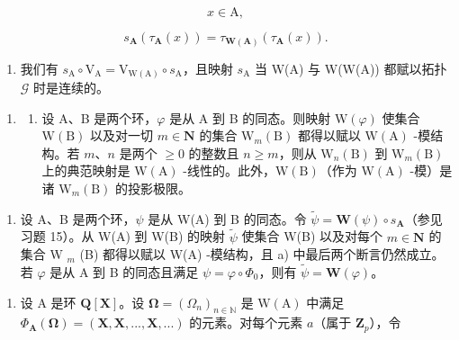 \[
x \in \mathrm{A},
\]

\[
s _ {\mathbf {A}} \left(\tau_ {\mathbf {A}} (x)\right) = \tau_ {\mathbf {W} (\mathbf {A})} \left(\tau_ {\mathbf {A}} (x)\right).
\]

\begin{enumerate}
\def\labelenumi{\alph{enumi})}
\setcounter{enumi}{5}
\tightlist
\item
  我们有 \(s_{\mathrm{A}} \circ \mathrm{V}_{\mathrm{A}} = \mathrm{V}_{\mathrm{W(A)}} \circ s_{\mathrm{A}}\)，且映射 \(s_{\mathrm{A}}\) 当 W(A) 与 W(W(A)) 都赋以拓扑 \(\mathcal{G}\) 时是连续的。
\end{enumerate}

\begin{enumerate}
\def\labelenumi{\arabic{enumi})}
\setcounter{enumi}{15}
\tightlist
\item
  \begin{enumerate}
  \def\labelenumii{\alph{enumii})}
  \tightlist
  \item
    设 A、B 是两个环，\(\varphi\) 是从 A 到 B 的同态。则映射 \(\mathrm{W}(\varphi)\) 使集合 \(\mathrm{W(B)}\) 以及对一切 \(m \in \mathbf{N}\) 的集合 \(\mathrm{W}_{m}(\mathrm{B})\) 都得以赋以 \(\mathrm{W(A)}\) -模结构。若 \(m\)、\(n\) 是两个 \(\geqslant 0\) 的整数且 \(n \geqslant m\)，则从 \(\mathrm{W}_{n}(\mathrm{B})\) 到 \(\mathrm{W}_{m}(\mathrm{B})\) 上的典范映射是 \(\mathrm{W(A)}\) -线性的。此外，\(\mathrm{W(B)}\)（作为 \(\mathrm{W(A)}\) -模）是诸 \(\mathrm{W}_{m}(\mathrm{B})\) 的投影极限。
  \end{enumerate}
\end{enumerate}

\begin{enumerate}
\def\labelenumi{\alph{enumi})}
\setcounter{enumi}{1}
\tightlist
\item
  设 A、B 是两个环，\(\psi\) 是从 W(A) 到 B 的同态。令 \(\tilde{\psi} = \mathbf{W}(\psi) \circ s_{\mathbf{A}}\)（参见习题 15）。从 W(A) 到 W(B) 的映射 \(\tilde{\psi}\) 使集合 W(B) 以及对每个 \(m \in \mathbf{N}\) 的集合 W \(_{m}\) (B) 都得以赋以 W(A) -模结构，且 a) 中最后两个断言仍然成立。若 \(\varphi\) 是从 A 到 B 的同态且满足 \(\psi = \varphi \circ \Phi_{0}\)，则有 \(\tilde{\psi} = \mathbf{W}(\varphi)\)。
\end{enumerate}

\begin{enumerate}
\def\labelenumi{\arabic{enumi})}
\setcounter{enumi}{16}
\tightlist
\item
  设 A 是环 \(\mathbf{Q}[\mathbf{X}]\)。设 \(\boldsymbol{\Omega} = (\Omega_n)_{n \in \mathbb{N}}\) 是 \(\mathrm{W}(\mathrm{A})\) 中满足 \(\Phi_{\mathbf{A}}(\boldsymbol{\Omega}) = (\mathbf{X}, \mathbf{X}, ..., \mathbf{X}, ...)\) 的元素。对每个元素 \(a\)（属于 \(\mathbf{Z}_p\)），令
\end{enumerate}

